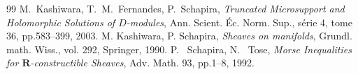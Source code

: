 \begin{thebibliography}{99}
		{%
		 M.~Kashiwara, T.~M.~Fernandes, 
		P.~Schapira, 
		\textit{Truncated Microsupport and Holomorphic Solutions 
		of \(D\)-modules}, 
		Ann. Scient. \'Ec. Norm. Sup., s\'erie 4, tome 36, 
		pp.583--399, 2003.
		 M. Kashiwara, P. Schapira, \emph{Sheaves on manifolds}, Grundl. math. Wiss., vol. 292, Springer, 1990.
		 P.~ Schapira, N.~ Tose, 
		\textit{Morse Inequalities for \(\mathbf{R}\)-constructible Sheaves}, 
		Adv. Math. 93, pp.1--8, 1992. 
		}
\end{thebibliography}





